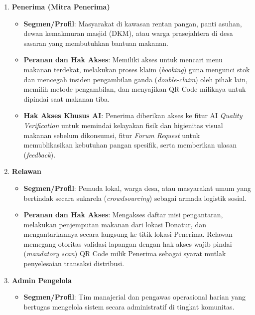\begin{enumerate}
\begin{itemize}
\begin{itemize}
            \item \textbf{\textit{Generate} Konten Media Sosial}: Hak spesial untuk secara otomatis menghasilkan gambar visual desain (lengkap dengan stiker verifikasi AI dan logo perusahaan) sekaligus memproduksi konten tulisan (\textit{copywriting}) promosi yang siap diunggah ke platform media sosial.
        \end{itemize}
    \end{itemize}
    \item \textbf{Penerima (Mitra Penerima)}
    \begin{itemize}
        \item \textbf{Segmen/Profil}: Masyarakat di kawasan rentan pangan, panti asuhan, dewan kemakmuran masjid (DKM), atau warga prasejahtera di desa sasaran yang membutuhkan bantuan makanan.
        \item \textbf{Peranan dan Hak Akses}: Memiliki akses untuk mencari menu makanan terdekat, melakukan proses klaim (\textit{booking}) guna mengunci stok dan mencegah insiden pengambilan ganda (\textit{double-claim}) oleh pihak lain, memilih metode pengambilan, dan menyajikan QR Code miliknya untuk dipindai saat makanan tiba.
        \item \textbf{Hak Akses Khusus AI}: Penerima diberikan akses ke fitur AI \textit{Quality Verification} untuk memindai kelayakan fisik dan higienitas visual makanan sebelum dikonsumsi, fitur \textit{Forum Request} untuk memublikasikan kebutuhan pangan spesifik, serta memberikan ulasan (\textit{feedback}).
    \end{itemize}
    \item \textbf{Relawan}
    \begin{itemize}
        \item \textbf{Segmen/Profil}: Pemuda lokal, warga desa, atau masyarakat umum yang bertindak secara sukarela (\textit{crowdsourcing}) sebagai armada logistik sosial.
        \item \textbf{Peranan dan Hak Akses}: Mengakses daftar misi pengantaran, melakukan penjemputan makanan dari lokasi Donatur, dan mengantarkannya secara langsung ke titik lokasi Penerima. Relawan memegang otoritas validasi lapangan dengan hak akses wajib pindai (\textit{mandatory scan}) QR Code milik Penerima sebagai syarat mutlak penyelesaian transaksi distribusi.
    \end{itemize}
    \item \textbf{Admin Pengelola}
    \begin{itemize}
        \item \textbf{Segmen/Profil}: Tim manajerial dan pengawas operasional harian yang bertugas mengelola sistem secara administratif di tingkat komunitas.

\end{itemize}
\end{enumerate}

